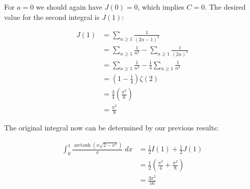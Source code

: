 \documentclass{letter}
\DeclareMathOperator\arctanh{arctanh}
\begin{document}
\begin{letter}{}
  For $a=0$ we should again have $J(0)=0$, which implies $C=0$. The desired value for the second integral is $J(1)$:

  \begin{align*}
    J(1) &= \sum_{n\ge 1}\frac{1}{(2n-1)^2}\\
    &= \sum_{n\ge 1}\frac{1}{n^2}-\sum_{n\ge 1}\frac{1}{(2n)^2}\\
    &= \sum_{n\ge 1}\frac{1}{n^2}-\frac{1}{4}\sum_{n\ge 1}\frac{1}{n^2}\\
    &= \left(1-\frac{1}{4}\right)\zeta(2)\\
    &=\frac{3}{4}\left(\frac{\pi^2}{6}\right)\\
    &=\frac{\pi^2}{8}
  \end{align*}

  The original integral now can be determined by our previous results:

  \begin{align*}
  \int_0^1\frac{\arctanh\left(x \sqrt{2-x^2}\right)}{x}\;dx 
    &=\frac{1}{2}I(1)+\frac{1}{2}J(1)\\
    &=\frac{1}{2}\left(\frac{\pi^2}{4}+\frac{\pi^2}{8}\right)\\
    &=\frac{3\pi^2}{16}
  \end{align*}
  


\end{letter}
\end{document}
